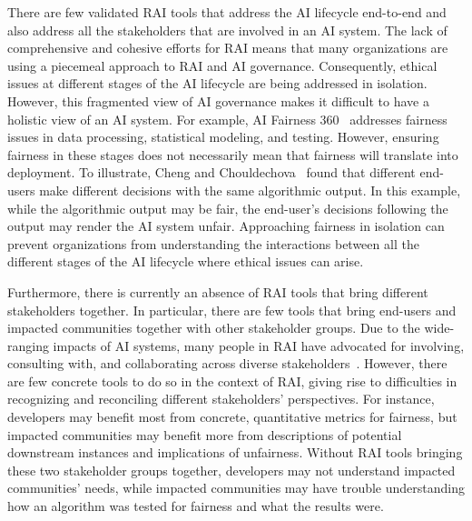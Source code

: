 There are few validated RAI tools that address the AI lifecycle end-to-end 
and also address all the stakeholders that are involved in an AI system.
The lack of comprehensive and cohesive efforts for RAI means that many organizations are using a piecemeal approach to RAI and AI governance. 
Consequently, ethical issues at different stages of the AI lifecycle are being addressed in isolation.
However, this fragmented view of AI governance makes it difficult to have a holistic view of an AI system.
For example, AI Fairness 360~\cite{Bellamy2019} addresses fairness issues in data processing, statistical modeling, and testing.
However, ensuring fairness in these stages does not necessarily mean that fairness will translate into deployment. 
To illustrate, Cheng and Chouldechova~\cite{cheng2022heterogeneity} found that different end-users make different decisions with the same algorithmic output. 
In this example, while the algorithmic output may be fair, the end-user's decisions following the output may render the AI system unfair.
Approaching fairness in isolation can prevent organizations from understanding the interactions between all the different stages of the AI lifecycle where ethical issues can arise.

Furthermore, there is currently an absence of RAI tools that bring different stakeholders together. In particular, there are few tools that bring end-users and impacted communities together with other stakeholder groups.
Due to the wide-ranging impacts of AI systems, many people in RAI have advocated for involving, consulting with, and collaborating across diverse stakeholders~\cite{rakova2021responsible}.
However, there are few concrete tools to do so in the context of RAI, giving rise to difficulties in recognizing and reconciling different stakeholders' perspectives.
For instance, developers may benefit most from concrete, quantitative metrics for fairness, but impacted communities may benefit more from descriptions of potential downstream instances and implications of unfairness.
Without RAI tools bringing these two stakeholder groups together, developers may not understand impacted communities' needs, while impacted communities may have trouble understanding how an algorithm was tested for fairness and what the results were.

